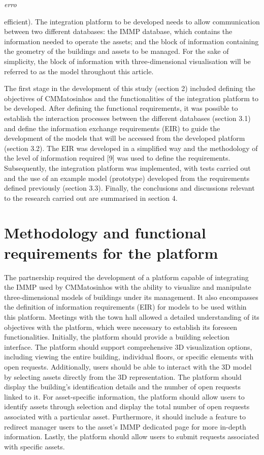 \documentclass[a4paper, 10pt, twocolumn, twoside]{article}
\begin{document}
\emph{erro}

efficient). The integration platform to be developed needs to allow communication between two different databases: the IMMP database, which contains the information needed to operate the assets; and the block of information containing the geometry of the buildings and assets to be managed. For the sake of simplicity, the block of information with three-dimensional visualisation will be referred to as the model throughout this article.

The first stage in the development of this study (section 2) included defining the objectives of CMMatosinhos and the functionalities of the integration platform to be developed. After defining the functional requirements, it was possible to establish the interaction processes between the different databases (section 3.1) and define the information exchange requirements (EIR) to guide the development of the models that will be accessed from the developed platform (section 3.2). The EIR was developed in a simplified way and the methodology of the level of information required [9] was used to define the requirements. Subsequently, the integration platform was implemented, with tests carried out and the use of an example model (prototype) developed from the requirements defined previously (section 3.3). Finally, the conclusions and discussions relevant to the research carried out are summarised in section 4.

\section{Methodology and functional requirements for the platform}
\label{sec:methodology}

The partnership required the development of a platform capable of integrating the IMMP used by CMMatosinhos with the ability to visualize and manipulate three-dimensional models of buildings under its management. It also encompasses the definition of information requirements (EIR) for models to be used within this platform. Meetings with the town hall allowed a detailed understanding of its objectives with the platform, which were necessary to establish its foreseen functionalities. Initially, the platform should provide a building selection interface. The platform should support comprehensive 3D visualization options, including viewing the entire building, individual floors, or specific elements with open requests. Additionally, users should be able to interact with the 3D model by selecting assets directly from the 3D representation. The platform should display the building's identification details and the number of open requests linked to it. For asset-specific information, the platform should allow users to identify assets through selection and display the total number of open requests associated with a particular asset. Furthermore, it should include a feature to redirect manager users to the asset's IMMP dedicated page for more in-depth information. Lastly, the platform should allow users to submit requests associated with specific assets.
\end{document}

